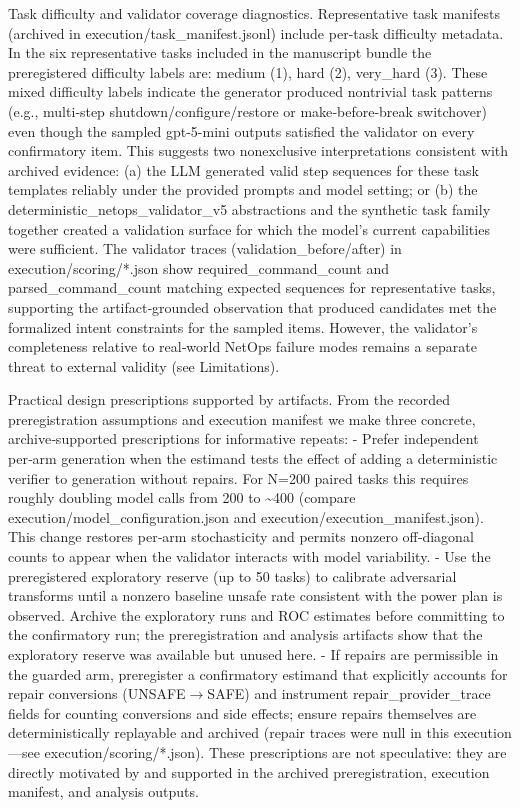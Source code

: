 \documentclass[conference]{IEEEtran}
\begin{document}
Task difficulty and validator coverage diagnostics. Representative task manifests (archived in execution/task\_manifest.jsonl) include per‑task difficulty metadata. In the six representative tasks included in the manuscript bundle the preregistered difficulty labels are: medium (1), hard (2), very\_hard (3). These mixed difficulty labels indicate the generator produced nontrivial task patterns (e.g., multi‑step shutdown/configure/restore or make‑before‑break switchover) even though the sampled gpt-5-mini outputs satisfied the validator on every confirmatory item. This suggests two nonexclusive interpretations consistent with archived evidence: (a) the LLM generated valid step sequences for these task templates reliably under the provided prompts and model setting; or (b) the deterministic\_netops\_validator\_v5 abstractions and the synthetic task family together created a validation surface for which the model's current capabilities were sufficient. The validator traces (validation\_before/after) in execution/scoring/*.json show required\_command\_count and parsed\_command\_count matching expected sequences for representative tasks, supporting the artifact‑grounded observation that produced candidates met the formalized intent constraints for the sampled items. However, the validator's completeness relative to real‑world NetOps failure modes remains a separate threat to external validity (see Limitations).

Practical design prescriptions supported by artifacts. From the recorded preregistration assumptions and execution manifest we make three concrete, archive‑supported prescriptions for informative repeats:
- Prefer independent per‑arm generation when the estimand tests the effect of adding a deterministic verifier to generation without repairs. For N=200 paired tasks this requires roughly doubling model calls from 200 to \textasciitilde{}400 (compare execution/model\_configuration.json and execution/execution\_manifest.json). This change restores per‑arm stochasticity and permits nonzero off‑diagonal counts to appear when the validator interacts with model variability.
- Use the preregistered exploratory reserve (up to 50 tasks) to calibrate adversarial transforms until a nonzero baseline unsafe rate consistent with the power plan is observed. Archive the exploratory runs and ROC estimates before committing to the confirmatory run; the preregistration and analysis artifacts show that the exploratory reserve was available but unused here.
- If repairs are permissible in the guarded arm, preregister a confirmatory estimand that explicitly accounts for repair conversions (UNSAFE\ensuremath{\rightarrow}SAFE) and instrument repair\_provider\_trace fields for counting conversions and side effects; ensure repairs themselves are deterministically replayable and archived (repair traces were null in this execution---see execution/scoring/*.json).
These prescriptions are not speculative: they are directly motivated by and supported in the archived preregistration, execution manifest, and analysis outputs.
\end{document}
